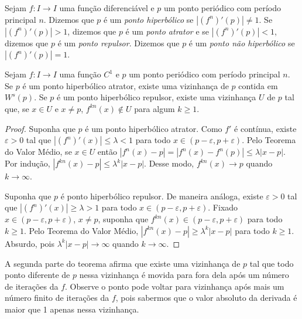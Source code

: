 \begin{definition}
Sejam $f: I \to I$ uma função diferenciável e $p$ um ponto periódico com período principal $n$. Dizemos que $p$ é um \textit{ponto hiperbólico} se $|(f^n)'(p)| \neq 1$. Se $|(f^n)'(p)| > 1$, dizemos que $p$ é um \textit{ponto atrator} e se $|(f^n)'(p)| < 1$, dizemos que $p$ é um \textit{ponto  repulsor}. Dizemos que $p$ é um \textit{ponto não hiperbólico} se $|(f^n)'(p)| = 1$.
\end{definition}


\begin{theorem}
Sejam $f: I \to I$ uma função $C^1$ e $p$ um ponto periódico com período principal $n$. Se $p$ é um ponto hiperbólico atrator, existe uma vizinhança de $p$ contida em $W^s(p)$. Se $p$ é um ponto hiperbólico repulsor, existe uma vizinhança $U$ de $p$ tal que, se $x \in U$ e $x \neq p$, $f^{kn}(x) \notin U$ para algum $k \geq 1$. 
\end{theorem}

\begin{proof}
Suponha que $p$ é um ponto hiperbólico atrator. Como $f'$ é contínua, existe $\varepsilon > 0$ tal que $|(f^n)'(x)| \leq \lambda < 1$ para todo $x \in (p - \varepsilon, p + \varepsilon)$. Pelo Teorema do Valor Médio, se $x \in U$ então $|f^n(x) - p| = |f^n(x) - f^n(p)| \leq \lambda|x - p|$. Por indução, $|f^{kn}(x) - p| \leq \lambda^k|x - p|$. Desse modo, $f^{kn}(x) \to p$ quando $k \to \infty$.

Suponha que $p$ é ponto hiperbólico repulsor. De maneira análoga, existe $\varepsilon > 0$ tal que $|(f^n)'(x)| \geq \lambda > 1$ para todo $x \in (p- \varepsilon, p + \varepsilon)$. Fixado $x \in (p - \varepsilon, p + \varepsilon)$, $x \neq p$, suponha que $f^{kn}(x) \in (p - \varepsilon, p + \varepsilon)$ para todo $k \geq 1$. Pelo Teorema do Valor Médio, $|f^{kn}(x) - p| \geq \lambda^k|x - p|$ para todo $k \geq 1$. Absurdo, pois $\lambda^k|x - p| \to \infty$ quando $k \to \infty$.
\end{proof}

A segunda parte do teorema afirma que existe uma vizinhança de $p$ tal que todo ponto diferente de $p$ nessa vizinhança é movida para fora dela após um número de iterações da $f$. Observe o ponto pode voltar para vizinhança após mais um número finito de iterações da $f$, pois sabermos que o valor absoluto da derivada é maior que 1 apenas nessa vizinhança.